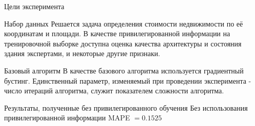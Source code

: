 \documentclass{beamer}
\begin{document}
\begin{frame}{Цели эксперимента}

\begin{block}{Набор данных}
Решается задача определения стоимости недвижимости по её координатам и площади. В качестве привилегированной информации на тренировочной выборке доступна оценка качества архитектуры и состояния здания экспертами, и некоторые другие признаки.
\end{block}


\begin{block}{Базовый алгоритм}
 В качестве базового алгоритма используется градиентный бустинг. Единственный параметр,
 изменяемый при проведении эксперимента - число итераций алгоритма, служит показателем сложности алгоритма.
\end{block}


\end{frame}

\begin{frame}{Результаты, полученные без привилегированного обучения}
Без использования привилегированной информации MAPE $= 0.1525$
\begin{figure}[!htb]
      \end{figure}

\end{frame}
\end{document}
